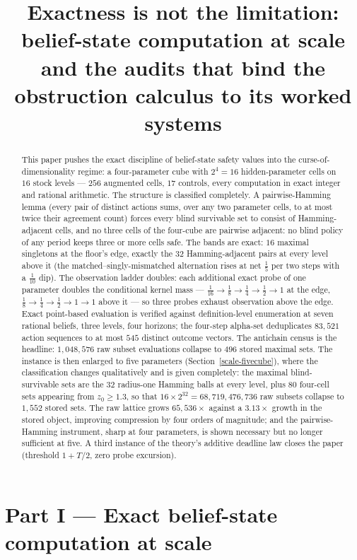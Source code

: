 \documentclass[10pt,twocolumn]{article}
\theoremstyle{plain}
\theoremstyle{definition}
\theoremstyle{remark}
\begin{document}
\title{Exactness is not the limitation: belief-state computation at scale and the audits that bind the obstruction calculus to its worked systems}

\part*{Part I --- Exact belief-state computation at scale}
\label{part:scale}

\maketitle

\begin{abstract}
This paper pushes the exact discipline of belief-state safety values into the curse-of-dimensionality regime: a four-parameter cube with
\(2^{4} = 16\) hidden-parameter cells on \(16\) stock levels ---
\(256\) augmented cells, \(17\) controls, every computation in exact
integer and rational arithmetic. The structure is classified
completely. A pairwise-Hamming lemma (every pair of distinct actions
sums, over any two parameter cells, to at most twice their agreement
count) forces every blind survivable set to consist of
Hamming-adjacent cells, and no three cells of the four-cube are
pairwise adjacent: no blind policy of any period keeps three or more
cells safe. The bands are exact: \(16\) maximal singletons at the
floor's edge, exactly the \(32\) Hamming-adjacent pairs at every level
above it (the matched--singly-mismatched alternation rises at net
\(\tfrac15\) per two steps with a \(\tfrac1{10}\) dip). The
observation ladder doubles: each additional exact probe of one
parameter doubles the conditional kernel mass ---
\(\tfrac1{16} \to \tfrac18 \to \tfrac14 \to \tfrac12 \to 1\) at the
edge, \(\tfrac18 \to \tfrac14 \to \tfrac12 \to 1 \to 1\) above it ---
so three probes exhaust observation above the edge. Exact point-based
evaluation is verified against definition-level enumeration at seven
rational beliefs, three levels, four horizons; the four-step alpha-set
deduplicates \(83{,}521\) action sequences to at most \(545\) distinct
outcome vectors. The antichain census is the headline: \(1{,}048{,}576\) raw subset evaluations collapse to \(496\) stored maximal sets. The instance is then enlarged to five parameters (Section~\ref{scale-fivecube}), where the classification changes qualitatively and is given completely: the maximal blind-survivable sets are the \(32\) radius-one Hamming balls at every level, plus \(80\) four-cell sets appearing from \(z_{0} \ge 1.3\), so that \(16 \times 2^{32} = 68{,}719{,}476{,}736\) raw subsets collapse to \(1{,}552\) stored sets. The raw lattice grows \(65{,}536\times\) against a \(3.13\times\) growth in the stored object, improving compression by four orders of magnitude; and the pairwise-Hamming instrument, sharp at four parameters, is shown necessary but no longer sufficient at five. A third instance of the theory's additive deadline law closes the paper (threshold \(1 + T/2\), zero probe excursion).
\end{abstract}
\end{document}
